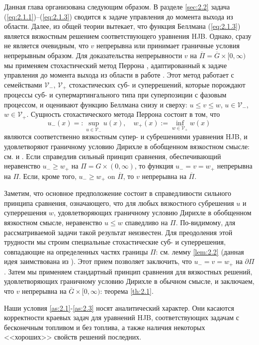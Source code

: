 Данная глава организована следующим образом. В разделе \ref{sec:2.2} задача (\ref{eq:2.1.1})--(\ref{eq:2.1.3}) сводится к задаче управления до момента выхода из области. Далее, из общей теории вытекает, что функция Беллмана (\ref{eq:2.1.3}) является вязкостным решением соответствующего уравнения HJB. Однако, сразу не является очевидным, что $v$ непрерывна или принимает граничные условия непрерывным образом. Для доказательства непрерывности $v$ на $\overline\Pi=\overline G\times [0,\infty)$ мы применяем стохастический метод Перрона  \cite{BaySir13}, адаптированный к задаче управления до момента выхода из области в работе \cite{Rok14}. Этот метод работает с
семействами $\mathcal V_-$, $\mathcal V_+$ стохастических суб- и суперрешений, которые порождают процессы суб- и супермартингального типа при суперпозиции с фазовым процессом, и оценивают функцию Беллмана снизу и сверху: $u\le v\le w$, $u\in\mathcal V_-$, $w\in\mathcal V_+$. Сущность стохастического метода Перрона состоит в том, что
$$ u_-(x)=:\sup_{u\in\mathcal V_-} u(x),\quad w_+(x):=\inf_{w\in\mathcal V_+} w(x)$$
являются соответственно вязкостным супер- и субрешениями уравнения HJB, и удовлетворяют  граничному условию Дирихле в обобщенном вязкостном смысле: см. \cite[определение 7.4]{CraIshLio92} и \cite[теоремы 2, 3]{Rok14}. Если справедлив сильный принцип сравнения, обеспечивающий неравенство $u_-\ge w_+$ на $\Pi=G\times (0,\infty)$, то функция $u_-=v=w_+$ непрерывна на  $\Pi$. Если, кроме того, $u_-\ge w_+$ on $\overline\Pi$, то $v$ непрерывна на $\overline\Pi$.

Заметим, что основное предположение \cite{Rok14} состоит в справедливости сильного принципа сравнения, означающего, что для любых вязкостного субрешения $u$ и суперрешения $w$, удовлетворяющих граничному условию Дирихле в обобщенном вязкостном смысле, неравенство $u\le w$ спаведливо на $\Pi$. По-видимому, для рассматриваемой задачи такой результат неизвестен. Для преодоления этой трудности мы строим специальные стохастические суб- и суперрешения, совпадающие на определенных частях границы $\Pi$: см. лемму \ref{lem:2.2} (данная идея заимствована из \cite{BayZha15}). Этот прием позволяет заключить, что $u_-=v=w_+$ на $\partial\Pi$. Затем мы применяем стандартный принцип сравнения для вязкостных решений, удовлетворяющих граничному условию Дирихле в обычном смысле, и заключаем, что $v$ непрерывна на $\overline G\times [0,\infty)$: теорема \ref{th:2.1}.

Наши условия \ref{as:2.1}-\ref{as:2.3} носят аналитический характер. Они касаются корректности краевых задач для уравнений   HJB, соответствующих задачам с бесконечным топливом и без топлива, а также наличия некоторых <<хороших>> свойств решений последних.

